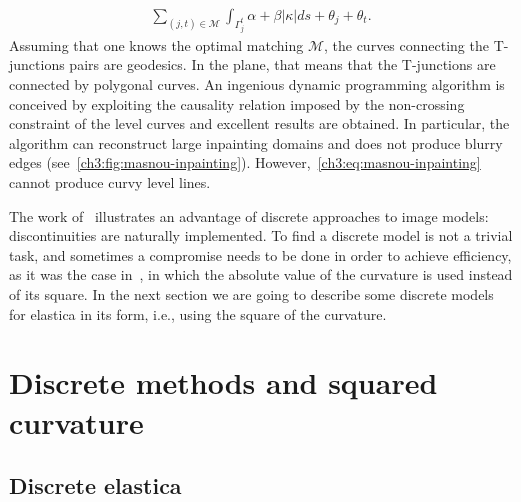 \begin{align}
	\sum_{(j,t) \in \mathcal{M}}{ \int_{\Gamma_j^t}{\alpha + \beta |\kappa|ds} + \theta_j + \theta_t }.
	\label{ch3:eq:masnou-inpainting}
\end{align}
%
%
Assuming that one knows the optimal matching $\mathcal{M}$, the curves connecting the T-junctions pairs are geodesics. In the plane, that means that the T-junctions are connected by polygonal curves. An ingenious dynamic programming algorithm is conceived  by exploiting the causality relation imposed by the non-crossing constraint of the level curves and excellent results are obtained. In particular, the algorithm can reconstruct large inpainting domains and does not produce blurry edges (see~\cref{ch3:fig:masnou-inpainting}). However,~\cref{ch3:eq:masnou-inpainting} cannot produce curvy level lines.


The work of~\cite{masnou98inpainting} illustrates an advantage of discrete approaches to image models: discontinuities are naturally implemented. To find a discrete model is not a trivial task, and sometimes a compromise needs to be done in order to achieve efficiency, as it was the case in~\cite{masnou98inpainting}, in which the absolute value of the curvature is used instead of its square. In the next section we are going to describe some discrete models for elastica in its  form, i.e., using the square of the curvature.


\section{Discrete methods and squared curvature}
\label{ch3:sec:discrete-methods-squared-curvature}

\subsection{Discrete elastica}

